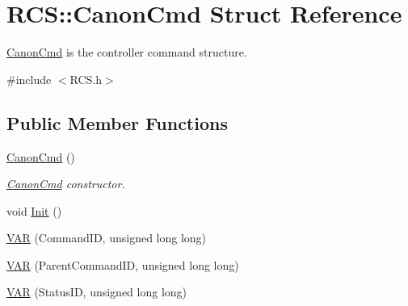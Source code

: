 \hypertarget{structRCS_1_1CanonCmd}{\section{R\-C\-S\-:\-:Canon\-Cmd Struct Reference}
\label{structRCS_1_1CanonCmd}
}


\hyperlink{structRCS_1_1CanonCmd}{Canon\-Cmd} is the controller command structure.  




{\ttfamily \#include $<$R\-C\-S.\-h$>$}

\subsection*{Public Member Functions}
\begin{DoxyCompactItemize}
\item 
\hyperlink{structRCS_1_1CanonCmd_a29c997874838bcca02aea1200bb785eb}{Canon\-Cmd} ()
\begin{DoxyCompactList}\small\item\em \hyperlink{structRCS_1_1CanonCmd}{Canon\-Cmd} constructor. \end{DoxyCompactList}\item 
void \hyperlink{structRCS_1_1CanonCmd_acc6132ab423f9349c970785d9f06d542}{Init} ()
\item 
\hyperlink{structRCS_1_1CanonCmd_a493a750837dc6e140e218f4d800faf72}{V\-A\-R} (Command\-I\-D, unsigned long long)
\item 
\hyperlink{structRCS_1_1CanonCmd_a052f3e27333e03886a95a7844e92b71c}{V\-A\-R} (Parent\-Command\-I\-D, unsigned long long)
\item 
\hyperlink{structRCS_1_1CanonCmd_a38899ecf42f1c5ca2921508dea054e3e}{V\-A\-R} (Status\-I\-D, unsigned long long)
\end{DoxyCompactItemize}
